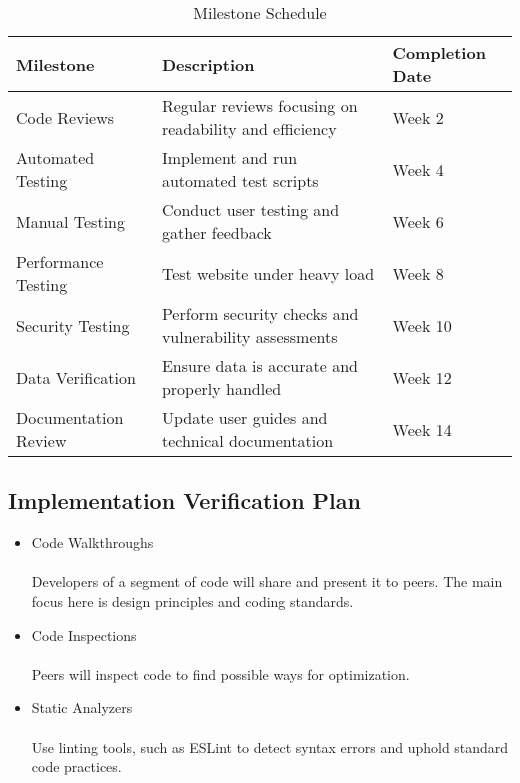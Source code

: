 \documentclass[12pt, titlepage]{article}
\begin{document}
\begin{table}[h]
\centering
\begin{tabular}{|l|l|l|}
\hline
\textbf{Milestone}        & \textbf{Description}                                          & \textbf{Completion Date} \\ \hline
Code Reviews              & Regular reviews focusing on readability and efficiency       & Week 2                  \\ \hline
Automated Testing         & Implement and run automated test scripts                     & Week 4                  \\ \hline
Manual Testing            & Conduct user testing and gather feedback                    & Week 6                  \\ \hline
Performance Testing       & Test website under heavy load                                & Week 8                  \\ \hline
Security Testing          & Perform security checks and vulnerability assessments        & Week 10                  \\ \hline
Data Verification         & Ensure data is accurate and properly handled                 & Week 12                  \\ \hline
Documentation Review      & Update user guides and technical documentation               & Week 14                 \\ \hline
\end{tabular}
\caption{Milestone Schedule}
\end{table}



\subsection{Implementation Verification Plan}

\begin{itemize}
    \item Code Walkthroughs
    \\ \\ Developers of a segment of code will share and present it to peers. The main focus here is design principles and coding standards.

    \item Code Inspections
    \\ \\ Peers will inspect code to find possible ways for optimization.

    \item Static Analyzers
    \\ \\ Use linting tools, such as ESLint to detect syntax errors and uphold standard code practices.
\end{itemize}
\end{document}

